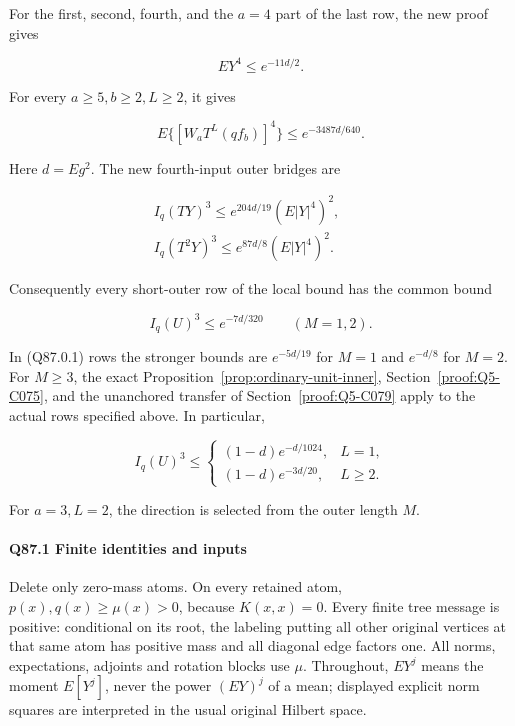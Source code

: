 For the first, second, fourth, and the \(a=\allowbreak 4\) part of the last row,
the new proof gives

\[
 EY^4\le e^{-11d/2}.
 \tag{Q87.0.1}\label{eq:Q87:0.1}
\]

For every \(a\ge\allowbreak 5,\allowbreak  b\ge\allowbreak 2,\allowbreak  L\ge\allowbreak 2\), it gives

\[
 E\{[W_aT^L(qf_b)]^4\}\le e^{-3487d/640}.
 \tag{Q87.0.2}\label{eq:Q87:0.2}
\]

Here \(d=\allowbreak Eg^2\). The new fourth-input outer bridges are

\[
\begin{gathered}
I_q(TY)^3\le e^{204d/19}(E|Y|^4)^2,\qquad\\
I_q(T^2Y)^3\le e^{87d/8}(E|Y|^4)^2.
\end{gathered}\tag{Q87.0.3}\label{eq:Q87:0.3}
\]

Consequently every short-outer row of the local bound has the common bound

\[
 I_q(U)^3\le e^{-7d/320}\qquad(M=1,2).
 \tag{Q87.0.4}\label{eq:Q87:0.4}
\]

In (Q87.0.1) rows the stronger bounds are \(e^{-5d/19}\) for \(M=\allowbreak 1\)
and \(e^{-d/8}\) for \(M=\allowbreak 2\). For \(M\ge\allowbreak 3\), the exact
Proposition~\ref{prop:ordinary-unit-inner}, Section~\ref{proof:Q5-C075}, and the unanchored transfer of Section~\ref{proof:Q5-C079} apply to the actual rows
specified above. In particular,

\[
 I_q(U)^3\le
 \begin{cases}
 (1-d)e^{-d/1024},&L=1,\\
 (1-d)e^{-3d/20},&L\ge2.
 \end{cases}
 \tag{Q87.0.5}\label{eq:Q87:0.5}
\]

For \(a=\allowbreak 3,\allowbreak  L=\allowbreak 2\), the direction is selected from the outer length \(M\).

\paragraph{Q87.1 Finite identities and inputs}\label{part:Q87.1}

Delete only zero-mass atoms. On every retained atom,
\(p(x),\allowbreak  q(x)\ge\allowbreak \mu(x)>\allowbreak 0\), because \(K(x,\allowbreak  x)=\allowbreak 0\). Every finite tree message is positive: conditional on its root, the labeling
putting all other original vertices at that same atom has positive
mass and all diagonal edge factors one. All norms, expectations, adjoints and rotation blocks use \(\mu\).
Throughout, \(EY^j\) means the moment \(E[Y^j]\), never the
power \((EY)^j\) of a mean; displayed explicit norm
squares are interpreted in the usual original Hilbert space.

